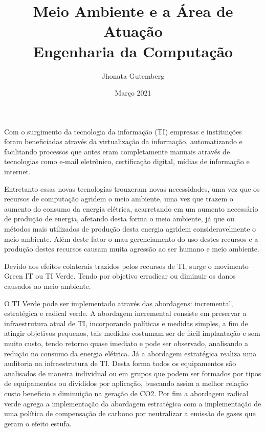 \documentclass[12pt]{article}
\title{
    Meio Ambiente e a Área de Atuação \\
    \large Engenharia da Computação
}
\author{
    Jhonata Gutemberg
}
\date{Março 2021}
\begin{document}
    \maketitle

    \par Com o surgimento da tecnologia da informação (TI) empresas e
    instituições foram beneficiadas através da virtualização da informação,
    automatizando e facilitando processos que antes eram completamente 
    manuais através de tecnologias como e-mail eletrônico, certificação
    digital, mídias de informação e internet.
    \par Entretanto essas novas tecnologias trouxeram novas necessidades,
    uma vez que os recursos de computação agridem o meio ambiente, uma
    vez que trazem o aumento do consumo da energia elétrica, acarretando
    em um aumento necessário de produção de energia, afetando desta forma
    o meio ambiente, já que ou métodos mais utilizados de produção desta
    energia agridem consideravelmente o meio ambiente. Além deste fator
    o mau gerenciamento do uso destes recursos e a produção destes recursos
    causam muita agressão ao ser humano e meio ambiente.
    \par Devido aos efeitos colaterais trazidos pelos recursos de TI, 
    surge o movimento Green IT ou TI Verde. Tendo por objetivo erradicar
    ou diminuir os danos causados ao meio ambiente.
    \par O TI Verde pode ser implementado através das abordagens: 
    incremental, estratégica e radical verde. A abordagem incremental
    consiste em preservar a infraestrutura atual de TI, incorporando 
    políticas e medidas simples, a fim de atingir objetivos pequenos, 
    tais medidas costumam ser de fácil implantação e sem muito custo,
    tendo retorno quase imediato e pode ser observado, analisando a redução
    no consumo da energia elétrica. Já a abordagem estratégica realiza
    uma auditoria na infraestrutura de TI. Desta forma todos os equipamentos
    são analisados de maneira individual ou em grupos que podem ser
    formados por tipos de equipamentos ou divididos por aplicação, buscando
    assim a melhor relação custo beneficio e diminuição na geração de CO2.
    Por fim a abordagem radical verde agrega a implementação da abordagem
    estratégica com a implementação de uma política de compensação de 
    carbono por neutralizar a emissão de gases que geram o efeito estufa.
\end{document}

